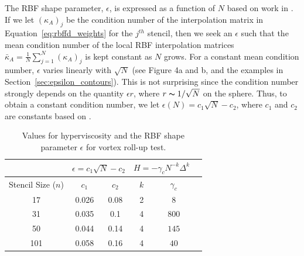 \documentclass{report}
\begin{document}
The RBF shape parameter, $\epsilon$, is expressed as a function of $N$ based on work in \cite{FlyerLehto11}. If we let $(\kappa_A)_j$ be the condition number of the interpolation matrix in Equation~\ref{eq:rbffd_weights} for the $j^{th}$ stencil, then we seek an $\epsilon$ such that the mean condition number of the local RBF interpolation matrices $\bar{\kappa}_A = \frac{1}{N}\sum_{j=1}^N (\kappa_A)_j$ is kept constant as $N$ grows. For a constant mean condition number, $\epsilon$ varies linearly with $\sqrt{N}$ (see \cite{FlyerLehto11} Figure 4a and b, and the examples in Section~\ref{sec:epsilon_contours}). This is not surprising since the condition number strongly depends on the quantity $\epsilon r$, where $r\thicksim1/\sqrt{N}$ on the sphere. Thus, to obtain a constant condition number, we let $\epsilon (N) = c_1 \sqrt{N} - c_2$, where $c_1$ and $c_2$ are constants based on \cite{FlyerLehto11}.

\begin{table}[t]
\caption{Values for hyperviscosity and the RBF shape parameter $\epsilon$ for vortex roll-up test.}
\begin{center}
\begin{tabular}{|c|c|c|c|c|c|}
\hline		     & \multicolumn{2}{c|}{$\epsilon = c_1 \sqrt{N} - c_2$} & \multicolumn{2}{c|}{$H = -\gamma_{c} N^{-k} \Delta^{k}$ } \\ \hline
Stencil Size ($n$) & $c_{1}$ & $c_{2}$ & $k$ & $\gamma_c$ \\ \hline
17 & 0.026 & 0.08 & 2 & $8$ \\
31 & 0.035 & 0.1  & 4 & $800$ \\
50 & 0.044 & 0.14 & 4 & $145$ \\
101 & 0.058 & 0.16 & 4 & $40$ \\ \hline
\end{tabular}
\end{center}
\label{tbl:vortex_hv_params}
\end{table}
\end{document}
